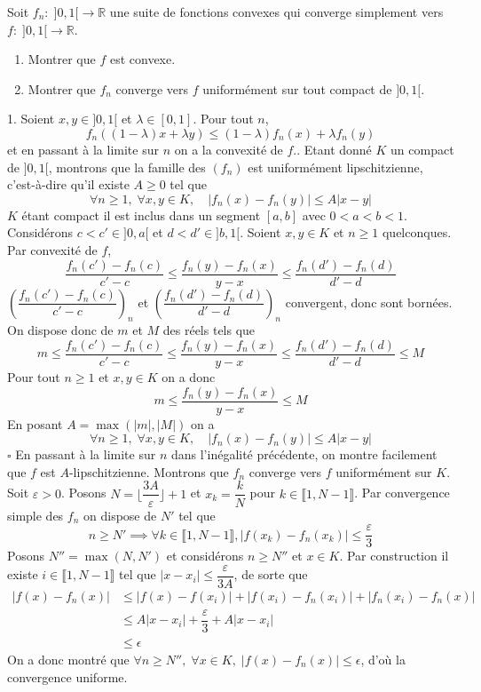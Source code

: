 \documentclass{fancybook}
\begin{document}
\begin{exercice}
Soit $f_n:\;]0,1[\to \mathbb R$ une suite de fonctions convexes qui converge simplement vers $f:\; ]0,1[\to \mathbb R$.
\begin{enumerate}
\item Montrer que $f$ est convexe.
\item Montrer que $f_n$ converge vers $f$ uniformément sur tout compact de $]0,1[$.
\end{enumerate}
\end{exercice}
1. Soient $x,y\in ]0,1[$ et $\lambda\in [0,1]$. Pour tout $n$, $$f_n((1-\lambda)x+\lambda y)\leq (1-\lambda)f_n(x) + \lambda f_n(y)$$ et en passant à la limite sur $n$ on a la convexité de $f$.\newline {}. Etant donné $K$ un compact de $]0,1[$, montrons que la famille des $(f_n)$ est uniformément lipschitzienne, c'est-à-dire qu'il existe $A\geq 0$ tel que $$\forall n\geq 1,\; \forall x,y\in K,\quad |f_n(x)-f_n(y)|\leq A |x-y|$$
$K$ étant compact il est inclus dans un segment $[a,b]$ avec $0<a<b<1$. Considérons $c<c'\in ]0,a[$ et $d<d'\in ]b,1[$.\newline
Soient $x,y\in K$ et $n\geq 1$ quelconques. Par convexité de $f$, $$\dfrac{f_n(c')-f_n(c)}{c'-c} \leq \dfrac{f_n(y)-f_n(x)}{y-x}\leq \dfrac{f_n(d')-f_n(d)}{d'-d}$$
$\left(\dfrac{f_n(c')-f_n(c)}{c'-c}\right)_n$ et $\left(\dfrac{f_n(d')-f_n(d)}{d'-d}\right)_n$ convergent, donc sont bornées. On dispose donc de $m$ et $M$ des réels tels que $$m\leq \dfrac{f_n(c')-f_n(c)}{c'-c} \leq \dfrac{f_n(y)-f_n(x)}{y-x}\leq \dfrac{f_n(d')-f_n(d)}{d'-d}\leq M$$
Pour tout $n\geq 1$ et $x,y\in K$ on a donc $$ m \leq \dfrac{f_n(y)-f_n(x)}{y-x} \leq M$$
En posant $A=\max(|m|,|M|)$ on a $$\forall n\geq 1,\; \forall x,y\in K,\quad |f_n(x)-f_n(y)|\leq A |x-y|$$
\null \hfill $\square$ \newline
En passant à la limite sur $n$ dans l'inégalité précédente, on montre facilement que $f$ est $A$-lipschitzienne.\newline
Montrons que $f_n$ converge vers $f$ uniformément sur $K$.\newline
Soit $\varepsilon >0$. \newline
Posons $N=\lfloor \dfrac{3A}{\varepsilon}\rfloor +1$ et $x_k=\dfrac{k}{N}$ pour $k\in \llbracket 1,N-1\rrbracket$.\newline
Par convergence simple des $f_n$ on dispose de $N'$ tel que $$n\geq N'\implies \forall k\in \llbracket 1,N-1\rrbracket, |f(x_k)-f_n(x_k)|\leq \dfrac{\varepsilon}{3}$$
Posons $N''=\max(N,N')$ et considérons $n\geq N''$ et $x\in K$.\newline
Par construction il existe $i\in \llbracket 1,N-1\rrbracket$ tel que $|x-x_i|\leq \dfrac{\varepsilon}{3A}$, de sorte que 
$$\begin{aligned}
|f(x)-f_n(x)|&\leq |f(x)-f(x_i)| + |f(x_i)-f_n(x_i)| + |f_n(x_i)-f_n(x)| \\
&\leq A |x-x_i| + \dfrac{\varepsilon}{3}  + A |x-x_i|\\
&\leq \epsilon
\end{aligned}$$
On a donc montré que $\forall n\geq N'',\; \forall x\in K, \; |f(x)-f_n(x)|\leq \epsilon$, d'où la convergence uniforme.
\end{document}
